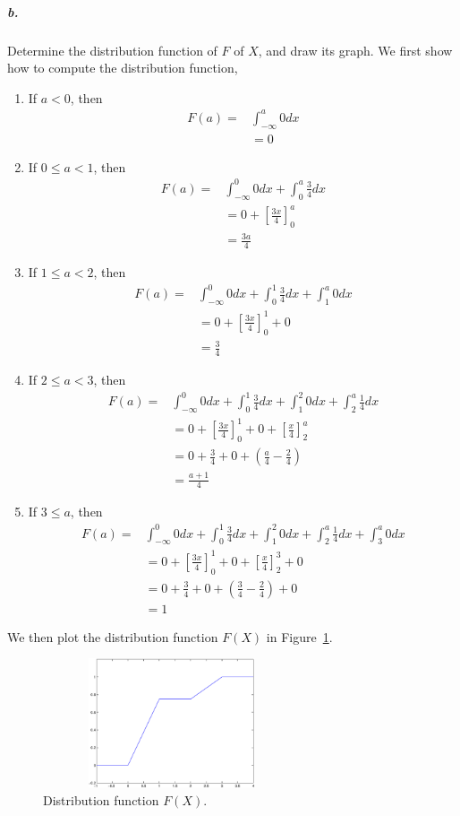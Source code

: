\documentclass[11pt]{article} %
\begin{document}
\subparagraph*{b.} Determine the distribution function of $F$ of $X$, and draw its graph. 
We first show how to compute the distribution function, 
\begin{enumerate}
\item If $a < 0$, then 
\begin{align*}
F(a) = & \int_{-\infty}^a 0 dx  \\
& =  0 
\end{align*} 
\item If $0 \leq a < 1$, then 
\begin{align*}
F(a) = & \int_{-\infty}^0 0 dx + \int_{0}^a \frac{3}{4} dx \\
& = 0 + \left[\frac{3x}{4}\right]_{0}^a \\
& = \frac{3a}{4}
\end{align*}
\item If $1 \leq a < 2$, then
\begin{align*}
F(a) = & \int_{-\infty}^0 0 dx + \int_{0}^1 \frac{3}{4} dx + \int_{1}^a 0 dx \\
& = 0 + \left[\frac{3x}{4}\right]_{0}^1 + 0  \\
& = \frac{3}{4}
\end{align*}
\item If $2 \leq a < 3$, then 
\begin{align*}
F(a) = & \int_{-\infty}^0 0 dx + \int_{0}^1 \frac{3}{4} dx + \int_{1}^2 0 dx + \int_{2}^a \frac{1}{4} dx \\
& = 0 + \left[\frac{3x}{4}\right]_{0}^1 + 0 + \left[ \frac{x}{4} \right]_{2}^a \\
& = 0 + \frac{3}{4} + 0 + (\frac{a}{4} - \frac{2}{4}) \\
& = \frac{a+1}{4}
\end{align*}
\item If $3 \leq a$, then
\begin{align*}
F(a) = & \int_{-\infty}^0 0 dx + \int_{0}^1 \frac{3}{4} dx + \int_{1}^2 0 dx + \int_{2}^a \frac{1}{4} dx + \int_{3}^a 0 dx \\
& = 0 + \left[\frac{3x}{4}\right]_{0}^1 + 0 + \left[ \frac{x}{4}\right]_{2}^3 + 0 \\
& = 0 + \frac{3}{4} + 0 + (\frac{3}{4} - \frac{2}{4}) + 0 \\
& = 1
\end{align*}
\end{enumerate}

We then plot the distribution function $F(X)$ in Figure~\ref{Fig:ch0501b}. 
\begin{figure}[h!]
\centering
\includegraphics[width=3in, height=1.5in]{ch0501b.eps}
\caption{Distribution function $F(X)$.}
\label{Fig:ch0501b}
\end{figure}
\end{document}
